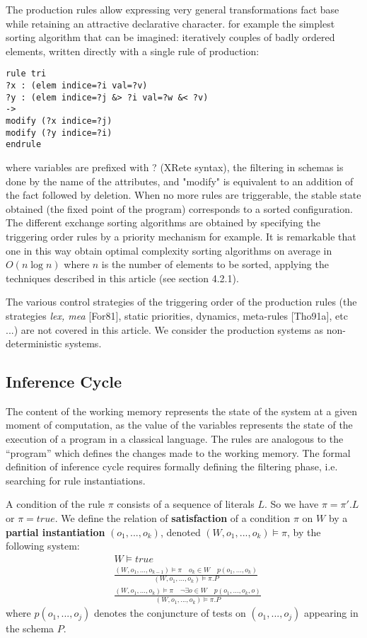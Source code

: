 The production rules allow expressing very general transformations
fact base while retaining an attractive declarative character. for example
the simplest sorting algorithm that can be imagined: iteratively
couples of badly ordered elements, written directly with a single rule of
production:
\begin{verbatim}
rule tri
?x : (elem indice=?i val=?v)
?y : (elem indice=?j &> ?i val=?w &< ?v)
->
modify (?x indice=?j)
modify (?y indice=?i)
endrule
\end{verbatim}
where variables are prefixed with ? (XRete syntax), the filtering in schemas is done
by the name of the attributes, and "modify" is equivalent to an addition of the fact followed by deletion.
When no more rules are triggerable, the stable state
obtained (the fixed point of the program) corresponds to a sorted configuration. The different
exchange sorting algorithms are obtained by specifying the triggering order
rules by a priority mechanism for example. It is remarkable that one
in this way obtain optimal complexity sorting algorithms on average
in $O(n  \log {n})$ where $n$ is the number of elements to be sorted, applying the techniques
described in this article (see section 4.2.1).

The various control strategies of the triggering order of the production rules
(the strategies \textit{lex, mea} [For81], static priorities, dynamics, meta-rules [Tho91a],
etc ...) are not covered in this article. We consider the production systems
as non-deterministic systems.

\subsection{Inference Cycle}

The content of the working memory represents the state of the system at a given moment
of computation, as the value of the variables represents the state of the execution of a program in a classical language. The rules are analogous to the ``program'' which
defines the changes made to the working memory. The formal definition of
inference cycle requires formally defining the filtering phase, i.e.
searching for rule instantiations.

A condition of the rule $\pi$ consists of a sequence of literals $L$. So we have
$\pi = \pi' . L$ or $\pi = true$.  We define the relation of \textbf{satisfaction} of a condition $\pi$ on
$W$ by a \textbf{partial instantiation} $(o_1, ..., o_k)$, denoted $(W, o_1, ..., o_k) \vDash \pi$, by the
following system:
\begin{eqnarray}
& W \vDash true \\
& \displaystyle \frac{(W, o_1, ..., o_{k-1}) \vDash \pi \quad o_k \in W \quad p(o_1, ... , o_k)}
{(W, o_1, ..., o_k) \vDash \pi . P} \\
& \displaystyle \frac{(W, o_1, ..., o_k) \vDash \pi \quad \neg \exists o \in W \quad p(o_1, ... , o_k, o)}
{(W, o_1, ..., o_k) \vDash \pi . P}
\end{eqnarray}
where $p(o_1, ..., o_j)$ denotes the conjuncture of tests on $(o_1, ..., o_j)$ appearing in the
schema $P$.

